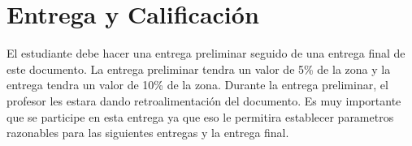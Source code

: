 \documentclass{article}
\begin{document}
\section*{Entrega y Calificaci\'on}

El estudiante debe hacer una entrega preliminar seguido de una entrega
final de este documento. La entrega preliminar tendra un valor de
5\% de la zona y la entrega tendra un valor de 10\% de la zona.
Durante la entrega preliminar, el profesor les estara dando retroalimentaci\'on
del documento. Es muy importante que se participe en esta entrega ya que
eso le permitira establecer parametros razonables para las siguientes entregas
y la entrega final.
\end{document}
